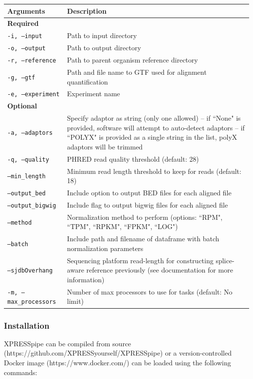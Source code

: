 \documentclass[11pt, a4paper, oneside]{article}
\begin{document}
\begin{tabular}{p{5cm}p{13cm}}
 \textbf{Arguments} & \textbf{Description} \\
 \hline
 \textbf{Required} & \\
 \hline
 \texttt{-i, --input} & Path to input directory \\
 \hline
 \texttt{-o, --output} & Path to output directory \\
 \hline
 \texttt{-r, --reference} & Path to parent organism reference directory \\
 \hline
 \texttt{-g, --gtf} & Path and file name to GTF used for alignment quantification \\
 \hline
 \texttt{-e, --experiment} & Experiment name \\
 \hline
 \textbf{Optional} & \\
 \hline
 \texttt{-a, --adaptors} & Specify adaptor as string (only one allowed) -- if ``None" is provided, software will attempt to auto-detect adaptors -- if ``POLYX" is provided as a single string in the list, polyX adaptors will be trimmed \\
 \hline
 \texttt{-q, --quality} & PHRED read quality threshold (default: 28) \\
 \hline
 \texttt{--min\_length} & Minimum read length threshold to keep for reads (default: 18) \\
 \hline
 \texttt{--output\_bed} & Include option to output BED files for each aligned file \\
 \hline
 \texttt{--output\_bigwig} & Include flag to output bigwig files for each aligned file \\
 \hline
 \texttt{--method} & Normalization method to perform (options: ``RPM", ``TPM", ``RPKM", ``FPKM", ``LOG") \\
 \hline
 \texttt{--batch} & Include path and filename of dataframe with batch normalization parameters \\
 \hline
 \texttt{--sjdbOverhang} & Sequencing platform read-length for constructing splice-aware reference previously (see documentation for more information) \\
 \hline
 \texttt{-m, --max\_processors} & Number of max processors to use for tasks (default: No limit) \\
\end{tabular}
\newline

\subsubsection{Installation}
XPRESSpipe can be compiled from source (https://github.com/XPRESSyourself/XPRESSpipe) or a version-controlled Docker image (https://www.docker.com/) can be loaded using the following commands:
\newline
\end{document}
